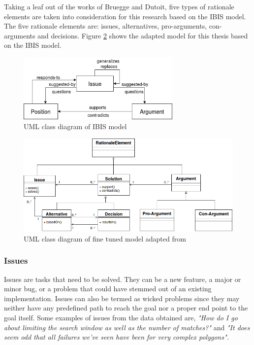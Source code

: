 \documentclass[a4paper,12pt,twoside]{report}
\begin{document}
\newline \newline
Taking a leaf out of the works of Bruegge and Dutoit\cite{Bruegge2009}, five types of rationale elements are taken into consideration for this research based on the IBIS model. The five rationale elements are: issues, alternatives, pro-arguments, con-arguments and decisions. Figure \ref{fig:thesisClassModel} shows the adapted model for this thesis based on the IBIS model. 
\begin{figure}[h] %
    \centering
    \includegraphics[width=8cm]{ibis-model}
    \caption{UML class diagram of IBIS model \cite{Kunz1970}}
    \label{fig:ibisModel}
\end{figure}

\begin{figure}[h] %
    \centering
    \includegraphics[width=12cm]{thesis-class-diagram}
    \caption{UML class diagram of fine tuned model adapted from \cite{Kunz1970}}
    \label{fig:thesisClassModel}
\end{figure}

 
\subsubsection{Issues}
Issues are tasks that need to be solved. They can be a new feature, a major or minor bug, or a problem that could have stemmed out of an existing implementation. Issues can also be termed as wicked problems \cite{Rittel1973} since they may neither have any predefined path to reach the goal nor a proper end point to the goal itself. Some examples of issues from the data obtained are, \textit{"How do I go about limiting the search window as well as the number of matches?"} and \textit{"It does seem odd that all failures we've seen have been for very complex polygons".}  
\end{document}
